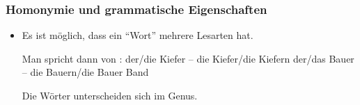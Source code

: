 


\begin{frame}
\frametitle{Homonymie und grammatische Eigenschaften}

\begin{itemize}
  \item Es ist möglich, dass ein "`Wort"' mehrere Lesarten hat.

Man spricht dann von : 
\eal
\ex der/die Kiefer -- die Kiefer/die Kiefern
\pause
\ex der/das Bauer -- die Bauern/die Bauer
\pause
\ex {} {Band} \pause{}
\zl

Die Wörter unterscheiden sich im Genus.

  \end{itemize}
\end{frame}





